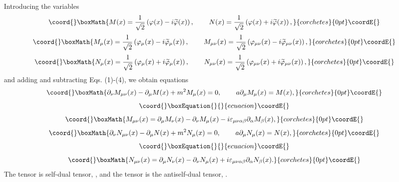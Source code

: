 \documentclass[a4paper,12pt]{article}
\begin{document}
Introducing the variables
\[\coord{}\boxMath{
M(x)=\frac 1{\sqrt{2}}\left( \varphi (x)-i\widetilde{\varphi
}(x)\right) , \hspace{0.3in}N(x)=\frac 1{\sqrt{2}}\left(\varphi
(x)+i\widetilde{\varphi}(x)\right) ,
}{corchetes}{0pt}\coordE{}\]
\[\coord{}\boxMath{
M_\mu (x)=\frac 1{\sqrt{2}}\left( \varphi_\mu
(x)-i\widetilde{\varphi}_\mu (x)\right) , \hspace{0.3in}M_{\mu \nu
}(x)=\frac 1{\sqrt{2}}\left( \varphi _{\mu \nu }(x)-i
\widetilde{\varphi}_{\mu \nu }(x)\right) ,
}{corchetes}{0pt}\coordE{}\]
\[\coord{}\boxMath{
 N_\mu (x)=\frac
1{\sqrt{2}}\left( \varphi_\mu (x)+i\widetilde{\varphi}_\mu
(x)\right) , \hspace{0.3in}N_{\mu \nu }(x)=\frac 1{\sqrt{2}}\left(
\varphi _{\mu \nu }(x)+i \widetilde{\varphi }_{\mu \nu }(x)\right)
,
}{corchetes}{0pt}\coordE{}\]
and adding and subtracting Eqs. (1)-(4), we obtain equations
\[\coord{}\boxMath{
\partial _\nu M_{\mu \nu }(x)-\partial _\mu M(x)+m^2M_\mu (x)=0,
\hspace{0.3in}a\partial _\mu M_\mu (x)=M(x) ,
}{corchetes}{0pt}\coordE{}\]
\vspace{-8mm}
\begin{equation}\coord{}\boxEquation{
\label{12}
}{
}{ecuacion}\coordE{}\end{equation}
\vspace{-8mm}
\[\coord{}\boxMath{
M_{\mu \nu }(x)=\partial _\mu M_\nu (x)-\partial _\nu M_\mu
(x)-i\varepsilon _{\mu \nu \alpha \beta }\partial _\alpha M_\beta
(x) ,
}{corchetes}{0pt}\coordE{}\]
\[\coord{}\boxMath{
\partial _\nu N_{\mu \nu }(x)-\partial _\mu N(x)+m^2N_\mu (x)=0 ,
\hspace{0.3in}a\partial _\mu N_\mu (x)=N(x) ,
}{corchetes}{0pt}\coordE{}\]
\vspace{-8mm}
\begin{equation}\coord{}\boxEquation{
\label{13}
}{
}{ecuacion}\coordE{}\end{equation}
\vspace{-8mm}
\[\coord{}\boxMath{
N_{\mu \nu }(x)=\partial _\mu N_\nu (x)-\partial _\nu N_\mu
(x)+i\varepsilon _{\mu \nu \alpha \beta }\partial _\alpha N_\beta
(x) .
}{corchetes}{0pt}\coordE{}\]
The tensor \coordHE{} is self-dual tensor, \coordHE{}, and the tensor \coordHE{} is the antiself-dual tensor, \coordHE{}.
\end{document}
